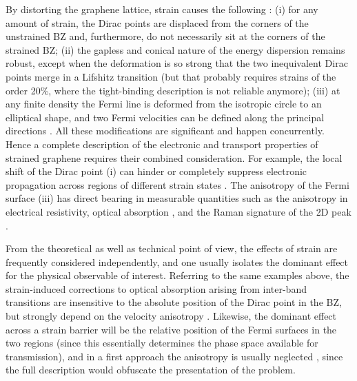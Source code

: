 By distorting the graphene lattice, strain causes the following \cite{Pereira2009}:
(i) for any amount of strain, the Dirac points are displaced from the corners of the unstrained BZ and, furthermore, do not necessarily sit at the corners of the strained BZ;
(ii) the gapless and conical nature of the energy dispersion remains robust, except when the deformation is so strong that the two inequivalent Dirac points merge in a Lifshitz transition (but that probably requires strains of the order 20\%, where the tight-binding description is not reliable anymore);
(iii) at any finite density the Fermi line is deformed from the isotropic circle to an elliptical shape, and two Fermi velocities can be defined along the principal directions \cite{Pereira2009,Pereira2010c,Choi2010}.
All these modifications are significant and happen concurrently. 
Hence a complete description of the electronic and transport properties of strained graphene requires their combined consideration.
For example, the local shift of the Dirac point (i) can hinder or completely suppress electronic propagation across regions of different strain states \cite{Pereira2009a,Fogler2008}.
The anisotropy of the Fermi surface (iii) has direct bearing in measurable quantities such as the anisotropy in electrical resistivity\cite{Kim2009}, optical absorption \cite{Pereira2010c,Pellegrino2010}, and the Raman signature of the 2D peak \cite{Huang2010,Mohr2010a,Frank2011,Yoon2011}.

From the theoretical as well as technical point of view, the effects of strain are frequently considered independently, and one usually isolates the dominant effect for the physical observable of interest.
Referring to the same examples above, the strain-induced corrections to optical absorption arising from inter-band transitions are insensitive to the absolute position of the Dirac point in the BZ, but strongly depend on the velocity anisotropy \cite{Pereira2010c,Pellegrino2010}.
Likewise, the dominant effect across a strain barrier will be the relative position of the Fermi surfaces in the two regions (since this essentially determines the phase space available for transmission), and in a first approach the anisotropy is usually neglected \cite{Fogler2008,Pereira2009a}, since the full description would obfuscate the presentation of the problem.

